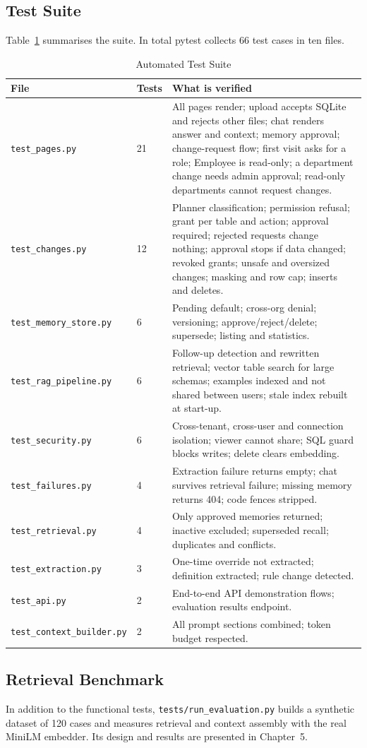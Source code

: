 \subsection{Test Suite}
Table~\ref{tab:tests} summarises the suite. In total pytest collects 66 test cases in ten
files.

\begin{table}[H]
    \centering
    \small
    \caption{Automated Test Suite}
    \small
    \begin{tabular}{p{5.0cm} p{0.9cm} p{8.8cm}}
        \toprule
        \textbf{File} & \textbf{Tests} & \textbf{What is verified} \\
        \midrule
        \texttt{test\_pages.py}           & 21 & All pages render; upload accepts SQLite and rejects other files; chat renders answer and context; memory approval; change-request flow; first visit asks for a role; Employee is read-only; a department change needs admin approval; read-only departments cannot request changes. \\[3pt]
        \texttt{test\_changes.py}         & 12 & Planner classification; permission refusal; grant per table and action; approval required; rejected requests change nothing; approval stops if data changed; revoked grants; unsafe and oversized changes; masking and row cap; inserts and deletes. \\[3pt]
        \texttt{test\_memory\_store.py}   &  6 & Pending default; cross-org denial; versioning; approve/reject/delete; supersede; listing and statistics. \\[3pt]
        \texttt{test\_rag\_pipeline.py}   &  6 & Follow-up detection and rewritten retrieval; vector table search for large schemas; examples indexed and not shared between users; stale index rebuilt at start-up. \\[3pt]
        \texttt{test\_security.py}        &  6 & Cross-tenant, cross-user and connection isolation; viewer cannot share; SQL guard blocks writes; delete clears embedding. \\[3pt]
        \texttt{test\_failures.py}        &  4 & Extraction failure returns empty; chat survives retrieval failure; missing memory returns 404; code fences stripped. \\[3pt]
        \texttt{test\_retrieval.py}       &  4 & Only approved memories returned; inactive excluded; superseded recall; duplicates and conflicts. \\[3pt]
        \texttt{test\_extraction.py}      &  3 & One-time override not extracted; definition extracted; rule change detected. \\[3pt]
        \texttt{test\_api.py}             &  2 & End-to-end API demonstration flows; evaluation results endpoint. \\[3pt]
        \texttt{test\_context\_builder.py}&  2 & All prompt sections combined; token budget respected. \\
        \bottomrule
    \end{tabular}
    \label{tab:tests}
\end{table}

\subsection{Retrieval Benchmark}
In addition to the functional tests, \texttt{tests/run\_evaluation.py} builds a synthetic
dataset of 120 cases and measures retrieval and context assembly with the real MiniLM
embedder. Its design and results are presented in Chapter~5.
